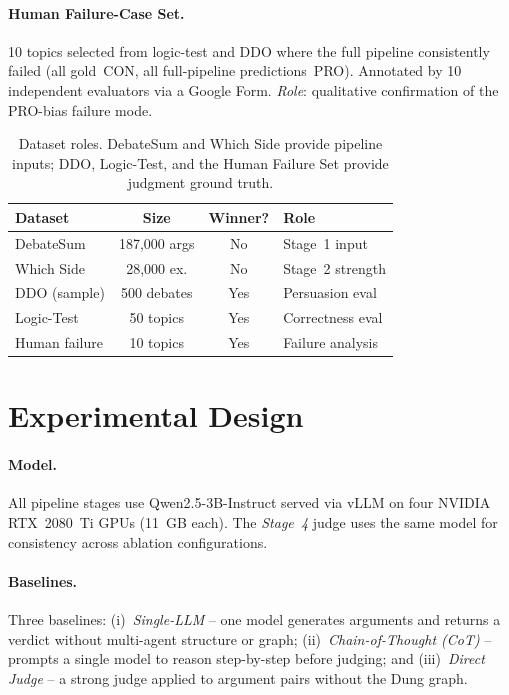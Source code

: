 \documentclass[11pt,twocolumn,letterpaper]{article}
\newcommand{\stage}[1]{\textit{Stage~#1}}
\newcommand{\DebateSumArgs}{187{,}000}
\newcommand{\WhichSideArgs}{28{,}000}
\newcommand{\DDOSample}{500}
\newcommand{\HumanTopics}{10}
\newcommand{\HumanAnnotators}{10}
\newcommand{\SmallModel}{Qwen2.5-3B-Instruct}
\begin{document}
\paragraph{Human Failure-Case Set.}
10 topics selected from logic-test and DDO where the full pipeline
consistently failed (all gold~CON, all full-pipeline predictions~PRO).
Annotated by \HumanAnnotators{} independent evaluators via a Google Form.
\textit{Role}: qualitative confirmation of the PRO-bias failure mode.

\begin{table}[h]
\centering\small
\setlength{\tabcolsep}{3pt}
\begin{tabular}{lccl}
\toprule
\textbf{Dataset} & \textbf{Size} & \textbf{Winner?} & \textbf{Role}\\
\midrule
DebateSum        & \DebateSumArgs{} args  & No  & Stage~1 input \\
Which Side       & \WhichSideArgs{} ex.   & No  & Stage~2 strength \\
DDO (sample)     & \DDOSample{} debates   & Yes & Persuasion eval \\
Logic-Test       & 50 topics              & Yes & Correctness eval \\
Human failure    & \HumanTopics{} topics  & Yes & Failure analysis \\
\bottomrule
\end{tabular}
\caption{Dataset roles. DebateSum and Which Side provide pipeline inputs;
DDO, Logic-Test, and the Human Failure Set provide judgment ground truth.}
\label{tab:datasets}
\end{table}

\section{Experimental Design}

\paragraph{Model.}
All pipeline stages use \SmallModel{} served via vLLM on four NVIDIA
RTX~2080~Ti GPUs (11~GB each).
The \stage{4} judge uses the same model for consistency across ablation
configurations.

\paragraph{Baselines.}
Three baselines: (i)~\textit{Single-LLM} -- one model generates arguments
and returns a verdict without multi-agent structure or graph;
(ii)~\textit{Chain-of-Thought (CoT)} -- prompts a single model to reason
step-by-step before judging; and
(iii)~\textit{Direct Judge} -- a strong judge applied to argument pairs
without the Dung graph.
\end{document}
